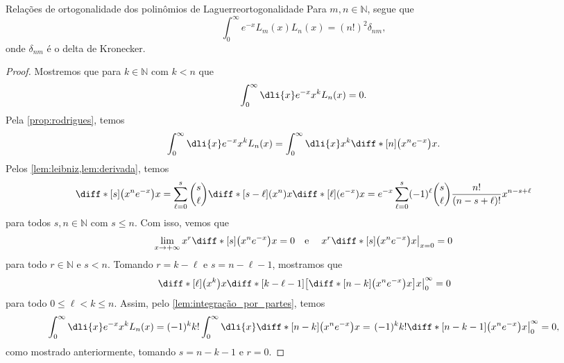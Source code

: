 \begin{proposition}{Relações de ortogonalidade dos polinômios de Laguerre}{ortogonalidade}
    Para \(m,n \in \mathbb{N}\), segue que
    \begin{equation*}
        \int_{0}^\infty e^{-x} L_m(x) L_n(x) = (n!)^2 \delta_{nm},
    \end{equation*}
    onde \(\delta_{nm}\) é o delta de Kronecker.
\end{proposition}
\begin{proof}
    Mostremos que para \(k \in \mathbb{N}\) com \(k < n\) que
    \begin{equation*}
        \int_{0}^\infty \dli{x} e^{-x} x^k L_n(x) = 0.
    \end{equation*}
    Pela \cref{prop:rodrigues}, temos
    \begin{equation*}
        \int_{0}^\infty \dli{x} e^{-x} x^k L_n(x) = \int_{0}^\infty \dli{x} x^k \diff*[n]{\left(x^n e^{-x}\right)}{x}.
    \end{equation*}
    Pelos \cref{lem:leibniz,lem:derivada}, temos
    \begin{equation*}
        \diff*[s]{\left(x^ne^{-x}\right)}{x} = \sum_{\ell = 0}^{s} \binom{s}{\ell} \diff*[s-\ell]{(x^n)}{x}\diff*[\ell]{(e^{-x})}{x} = e^{-x}\sum_{\ell = 0}^{s} (-1)^{\ell}\binom{s}{\ell} \frac{n!}{(n-s+\ell)!} x^{n - s + \ell}
    \end{equation*}
    para todos \(s, n \in \mathbb{N}\) com \(s \leq n\). Com isso, vemos que
    \begin{equation*}
    \lim_{x \to +\infty} x^r\diff*[s]{\left(x^ne^{-x}\right)}{x} = 0\quad\text{e}\quad \left.x^r\diff*[s]{\left(x^ne^{-x}\right)}{x}\right\rvert_{x=0} = 0
    \end{equation*}
    para todo \(r \in \mathbb{N}\) e \(s < n\). Tomando \(r = k - \ell\) e \(s = n - \ell - 1\), mostramos que
    \begin{equation*}
        \left.\diff*[\ell]{\left(x^k\right)}{x} \diff*[k - \ell - 1]{\left[\diff*[n - k]{\left(x^n e^{-x}\right)}{x}\right]}{x}\right\rvert_{0}^{\infty} = 0
    \end{equation*}
    para todo \(0 \leq \ell < k \leq n\). Assim, pelo \cref{lem:integração_por_partes}, temos
    \begin{equation*}
        \int_{0}^\infty \dli{x} e^{-x} x^k L_n(x) = (-1)^k k! \int_{0}^\infty \dli{x} \diff*[n - k]{\left(x^n e^{-x}\right)}{x} = \left.(-1)^k k! \diff*[n-k-1]{\left(x^ne^{-x}\right)}{x}\right\rvert_0^\infty = 0,
    \end{equation*}
    como mostrado anteriormente, tomando \(s = n - k - 1\) e \(r = 0\).


\end{proof}
